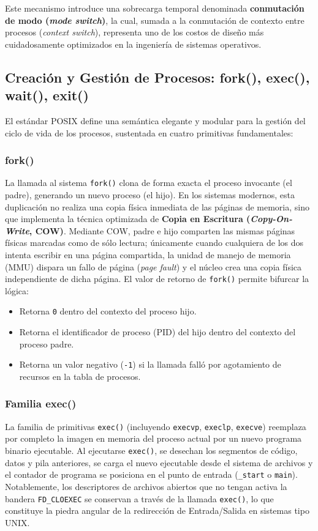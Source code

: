 \documentclass[11pt,letterpaper]{article}
\begin{document}
Este mecanismo introduce una sobrecarga temporal denominada \textbf{conmutación de modo (\textit{mode switch})}, la cual, sumada a la conmutación de contexto entre procesos (\textit{context switch}), representa uno de los costos de diseño más cuidadosamente optimizados en la ingeniería de sistemas operativos.

\subsection{Creación y Gestión de Procesos: fork(), exec(), wait(), exit()}

El estándar POSIX define una semántica elegante y modular para la gestión del ciclo de vida de los procesos, sustentada en cuatro primitivas fundamentales:

\subsubsection{fork()}
La llamada al sistema \texttt{fork()} clona de forma exacta el proceso invocante (el padre), generando un nuevo proceso (el hijo). En los sistemas modernos, esta duplicación no realiza una copia física inmediata de las páginas de memoria, sino que implementa la técnica optimizada de \textbf{Copia en Escritura (\textit{Copy-On-Write}, COW)}. Mediante COW, padre e hijo comparten las mismas páginas físicas marcadas como de sólo lectura; únicamente cuando cualquiera de los dos intenta escribir en una página compartida, la unidad de manejo de memoria (MMU) dispara un fallo de página (\textit{page fault}) y el núcleo crea una copia física independiente de dicha página.
El valor de retorno de \texttt{fork()} permite bifurcar la lógica:
\begin{itemize}
    \item Retorna \texttt{0} dentro del contexto del proceso hijo.
    \item Retorna el identificador de proceso (PID) del hijo dentro del contexto del proceso padre.
    \item Retorna un valor negativo (\texttt{-1}) si la llamada falló por agotamiento de recursos en la tabla de procesos.
\end{itemize}

\subsubsection{Familia exec()}
La familia de primitivas \texttt{exec()} (incluyendo \texttt{execvp}, \texttt{execlp}, \texttt{execve}) reemplaza por completo la imagen en memoria del proceso actual por un nuevo programa binario ejecutable. Al ejecutarse \texttt{exec()}, se desechan los segmentos de código, datos y pila anteriores, se carga el nuevo ejecutable desde el sistema de archivos y el contador de programa se posiciona en el punto de entrada (\texttt{\_start} o \texttt{main}). Notablemente, los descriptores de archivos abiertos que no tengan activa la bandera \texttt{FD\_CLOEXEC} se conservan a través de la llamada \texttt{exec()}, lo que constituye la piedra angular de la redirección de Entrada/Salida en sistemas tipo UNIX.
\end{document}
